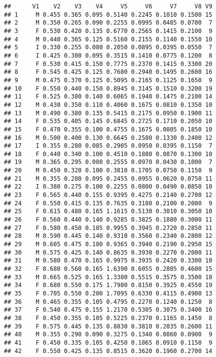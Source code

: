 \documentclass[
]{article}
\begin{document}
\begin{verbatim}
##      V1    V2    V3    V4     V5     V6     V7     V8 V9
## 1     M 0.455 0.365 0.095 0.5140 0.2245 0.1010 0.1500 15
## 2     M 0.350 0.265 0.090 0.2255 0.0995 0.0485 0.0700  7
## 3     F 0.530 0.420 0.135 0.6770 0.2565 0.1415 0.2100  9
## 4     M 0.440 0.365 0.125 0.5160 0.2155 0.1140 0.1550 10
## 5     I 0.330 0.255 0.080 0.2050 0.0895 0.0395 0.0550  7
## 6     I 0.425 0.300 0.095 0.3515 0.1410 0.0775 0.1200  8
## 7     F 0.530 0.415 0.150 0.7775 0.2370 0.1415 0.3300 20
## 8     F 0.545 0.425 0.125 0.7680 0.2940 0.1495 0.2600 16
## 9     M 0.475 0.370 0.125 0.5095 0.2165 0.1125 0.1650  9
## 10    F 0.550 0.440 0.150 0.8945 0.3145 0.1510 0.3200 19
## 11    F 0.525 0.380 0.140 0.6065 0.1940 0.1475 0.2100 14
## 12    M 0.430 0.350 0.110 0.4060 0.1675 0.0810 0.1350 10
## 13    M 0.490 0.380 0.135 0.5415 0.2175 0.0950 0.1900 11
## 14    F 0.535 0.405 0.145 0.6845 0.2725 0.1710 0.2050 10
## 15    F 0.470 0.355 0.100 0.4755 0.1675 0.0805 0.1850 10
## 16    M 0.500 0.400 0.130 0.6645 0.2580 0.1330 0.2400 12
## 17    I 0.355 0.280 0.085 0.2905 0.0950 0.0395 0.1150  7
## 18    F 0.440 0.340 0.100 0.4510 0.1880 0.0870 0.1300 10
## 19    M 0.365 0.295 0.080 0.2555 0.0970 0.0430 0.1000  7
## 20    M 0.450 0.320 0.100 0.3810 0.1705 0.0750 0.1150  9
## 21    M 0.355 0.280 0.095 0.2455 0.0955 0.0620 0.0750 11
## 22    I 0.380 0.275 0.100 0.2255 0.0800 0.0490 0.0850 10
## 23    F 0.565 0.440 0.155 0.9395 0.4275 0.2140 0.2700 12
## 24    F 0.550 0.415 0.135 0.7635 0.3180 0.2100 0.2000  9
## 25    F 0.615 0.480 0.165 1.1615 0.5130 0.3010 0.3050 10
## 26    F 0.560 0.440 0.140 0.9285 0.3825 0.1880 0.3000 11
## 27    F 0.580 0.450 0.185 0.9955 0.3945 0.2720 0.2850 11
## 28    M 0.590 0.445 0.140 0.9310 0.3560 0.2340 0.2800 12
## 29    M 0.605 0.475 0.180 0.9365 0.3940 0.2190 0.2950 15
## 30    M 0.575 0.425 0.140 0.8635 0.3930 0.2270 0.2000 11
## 31    M 0.580 0.470 0.165 0.9975 0.3935 0.2420 0.3300 10
## 32    F 0.680 0.560 0.165 1.6390 0.6055 0.2805 0.4600 15
## 33    M 0.665 0.525 0.165 1.3380 0.5515 0.3575 0.3500 18
## 34    F 0.680 0.550 0.175 1.7980 0.8150 0.3925 0.4550 19
## 35    F 0.705 0.550 0.200 1.7095 0.6330 0.4115 0.4900 13
## 36    M 0.465 0.355 0.105 0.4795 0.2270 0.1240 0.1250  8
## 37    F 0.540 0.475 0.155 1.2170 0.5305 0.3075 0.3400 16
## 38    F 0.450 0.355 0.105 0.5225 0.2370 0.1165 0.1450  8
## 39    F 0.575 0.445 0.135 0.8830 0.3810 0.2035 0.2600 11
## 40    M 0.355 0.290 0.090 0.3275 0.1340 0.0860 0.0900  9
## 41    F 0.450 0.335 0.105 0.4250 0.1865 0.0910 0.1150  9
## 42    F 0.550 0.425 0.135 0.8515 0.3620 0.1960 0.2700 14

\end{verbatim}
\end{document}
